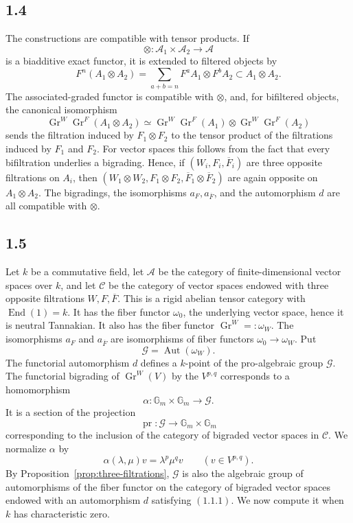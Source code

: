 \documentclass[11pt]{article}
\newcommand{\Gr}{\operatorname{Gr}}
\newcommand{\Aut}{\operatorname{Aut}}
\newcommand{\End}{\operatorname{End}}
\newcommand{\Gm}{\mathbb G_m}
\begin{document}
\subsection*{1.4}
The constructions are compatible with tensor products.  If
\[
 \otimes:\mathcal A_1\times \mathcal A_2\to \mathcal A
\]
is a biadditive exact functor, it is extended to filtered objects by
\[
 F^n(A_1\otimes A_2)=\sum_{a+b=n}F^aA_1\otimes F^bA_2\subset A_1\otimes A_2.
\]
The associated-graded functor is compatible with \(\otimes\), and, for bifiltered objects, the canonical isomorphism
\[
 \Gr^W\Gr^F(A_1\otimes A_2)\simeq
 \Gr^W\Gr^F(A_1)\otimes \Gr^W\Gr^F(A_2)
\]
sends the filtration induced by \(F_1\otimes F_2\) to the tensor product of the filtrations induced by \(F_1\) and \(F_2\).  For vector spaces this follows from the fact that every bifiltration underlies a bigrading.  Hence, if \((W_i,F_i,\overline F_i)\) are three opposite filtrations on \(A_i\), then \((W_1\otimes W_2,F_1\otimes F_2,\overline F_1\otimes \overline F_2)\) are again opposite on \(A_1\otimes A_2\).  The bigradings, the isomorphisms \(a_F,a_{\overline F}\), and the automorphism \(d\) are all compatible with \(\otimes\).

\subsection*{1.5}
Let \(k\) be a commutative field, let \(\mathcal A\) be the category of finite-dimensional vector spaces over \(k\), and let \(\mathcal C\) be the category of vector spaces endowed with three opposite filtrations \(W,F,\overline F\).  This is a rigid abelian tensor category with \(\End(1)=k\).  It has the fiber functor \(\omega_0\), the underlying vector space, hence it is neutral Tannakian.  It also has the fiber functor \(\Gr^W=:\omega_W\).  The isomorphisms \(a_F\) and \(a_{\overline F}\) are isomorphisms of fiber functors \(\omega_0\to \omega_W\).  Put
\[
   \mathcal G=\Aut(\omega_W).
\]
The functorial automorphism \(d\) defines a \(k\)-point of the pro-algebraic group \(\mathcal G\).  The functorial bigrading of \(\Gr^W(V)\) by the \(V^{p,q}\) corresponds to a homomorphism
\[
   \alpha:\Gm\times\Gm\longrightarrow \mathcal G.
\]
It is a section of the projection
\[
   \operatorname{pr}:\mathcal G\longrightarrow \Gm\times\Gm
\]
corresponding to the inclusion of the category of bigraded vector spaces in \(\mathcal C\).  We normalize \(\alpha\) by
\[
   \alpha(\lambda,\mu)v=\lambda^p\mu^q v\qquad (v\in V^{p,q}).
\]
By Proposition~\ref{prop:three-filtrations}, \(\mathcal G\) is also the algebraic group of automorphisms of the fiber functor on the category of bigraded vector spaces endowed with an automorphism \(d\) satisfying \((1.1.1)\).  We now compute it when \(k\) has characteristic zero.
\end{document}
